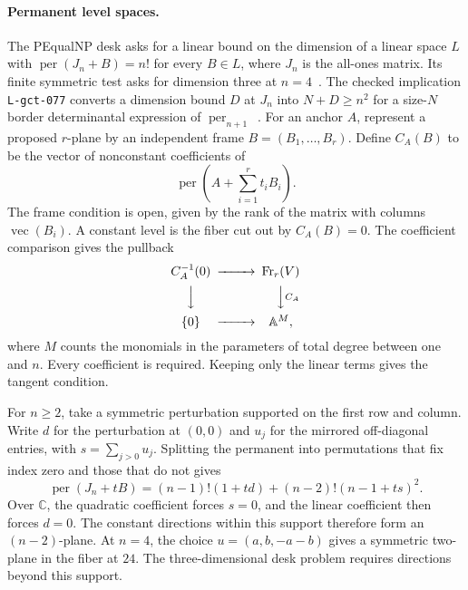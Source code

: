 \paragraph{Permanent level spaces.}
The PEqualNP desk asks for a linear bound on the dimension of a linear
space \(L\) with \(\operatorname{per}(J_n+B)=n!\) for every \(B\in L\),
where \(J_n\) is the all-ones matrix. Its finite symmetric test asks for
dimension three at \(n=4\)~\cite{gctlevelbound,gctfour}.
The checked implication \texttt{L-gct-077} converts a dimension bound
\(D\) at \(J_n\) into \(N+D\ge n^2\) for a size-\(N\) border determinantal
expression of \(\operatorname{per}_{n+1}\)~\cite{gctlevelbridge}.
For an anchor \(A\), represent a proposed \(r\)-plane by an independent
frame \(B=(B_1,\ldots,B_r)\). Define \(C_A(B)\) to be the vector of
nonconstant coefficients of
\begin{equation*}
  \operatorname{per}\!\left(A+\sum_{i=1}^r t_i B_i\right).
\end{equation*}
The frame condition is open, given by the rank of the matrix with
columns \(\operatorname{vec}(B_i)\). A constant level is the fiber cut
out by \(C_A(B)=0\). The coefficient comparison gives the pullback
\begin{equation*}
\begin{CD}
 C_A^{-1}(0) @>>> \operatorname{Fr}_r(V) \\
 @VVV @VV{C_A}V \\
 \{0\} @>>> \mathbb A^M,
\end{CD}
\end{equation*}
where \(M\) counts the monomials in the parameters of total degree
between one and \(n\). Every coefficient is required. Keeping only the
linear terms gives the tangent condition.

For \(n\ge 2\), take a symmetric perturbation supported on the first row and column.
Write \(d\) for the perturbation at \((0,0)\) and \(u_j\) for the
mirrored off-diagonal entries, with \(s=\sum_{j>0}u_j\). Splitting the
permanent into permutations that fix index zero and those that do not
gives
\begin{equation*}
  \operatorname{per}(J_n+tB)
   =(n-1)!(1+td)+(n-2)!(n-1+ts)^2.
\end{equation*}
Over \(\mathbb C\), the quadratic coefficient forces \(s=0\), and the
linear coefficient then forces \(d=0\). The constant directions within
this support therefore form an \((n-2)\)-plane. At \(n=4\), the choice
\(u=(a,b,-a-b)\) gives a symmetric two-plane in the fiber at \(24\).
The three-dimensional desk problem requires directions beyond this support.

